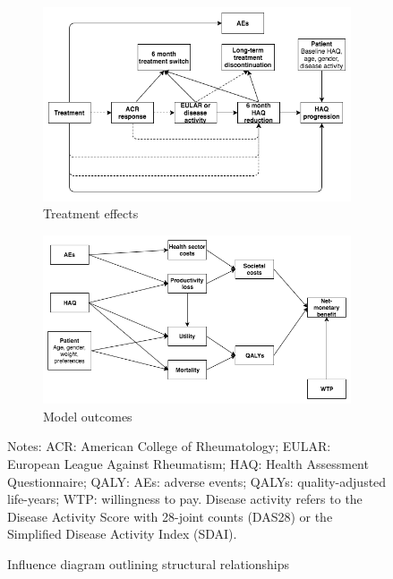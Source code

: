 \documentclass[11pt,final,fleqn]{article}\usepackage[]{graphicx}\usepackage[]{color}
\theoremstyle{plain}
\begin{document}
\begin{figure}
\centering
\begin{subfigure}{\textwidth}
\includegraphics[width=\textwidth]{figs/influence-diagram-a.png}
\caption{Treatment effects} \label{subfig:treatment-effects}
\end{subfigure}
\begin{subfigure}{\textwidth}
\includegraphics[width=\textwidth]{figs/influence-diagram-b.png}
\caption{Model outcomes} \label{subfig:model-outcomes}
\end{subfigure}
\caption{Influence diagram outlining structural relationships}\label{fig:influence-diagram}
\begin{minipage}{\linewidth}
\footnotesize
Notes: ACR: American College of Rheumatology; EULAR: European League Against Rheumatism; HAQ: Health Assessment Questionnaire; QALY: AEs: adverse events; QALYs: quality-adjusted life-years; WTP: willingness to pay. Disease activity refers to the Disease Activity Score with 28-joint counts (DAS28) or the Simplified Disease Activity Index (SDAI).
\end{minipage}
\end{figure}
\end{document}
